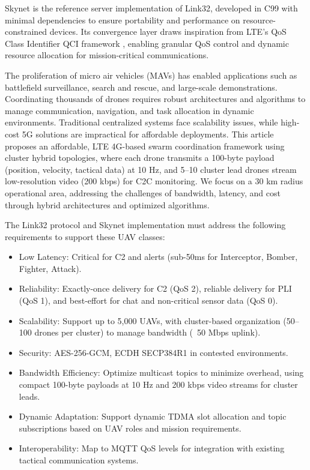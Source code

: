 \documentclass{article}
\begin{document}
Skynet is the reference server implementation of Link32, developed in C99 with minimal dependencies
to ensure portability and performance on resource-constrained devices. Its convergence layer draws
inspiration from LTE’s QoS Class Identifier QCI framework \cite{3gpp}, enabling granular QoS control and
dynamic resource allocation for mission-critical communications.

The proliferation of micro air vehicles (MAVs) has enabled applications
such as battlefield surveillance, search and rescue, and large-scale demonstrations.
Coordinating thousands of drones requires robust architectures and algorithms to
manage communication, navigation, and task allocation in dynamic environments.
Traditional centralized systems face scalability issues, while high-cost 5G
solutions are impractical for affordable deployments. This article proposes
an affordable, LTE 4G-based swarm coordination framework using cluster hybrid
topologies, where each drone transmits a 100-byte payload (position, velocity,
tactical data) at 10 Hz, and 5--10 cluster lead drones stream low-resolution
video (200 kbps) for C2C monitoring. We focus on a 30 km radius operational
area, addressing the challenges of bandwidth, latency, and cost through
hybrid architectures and optimized algorithms.

The Link32 protocol and Skynet implementation must address
the following requirements to support these UAV classes:

\begin{itemize}
\item Low Latency: Critical for C2 and alerts (sub-50ms for Interceptor, Bomber, Fighter, Attack).
\item Reliability: Exactly-once delivery for C2 (QoS 2), reliable delivery for PLI (QoS 1), and best-effort for chat and non-critical sensor data (QoS 0).
\item Scalability: Support up to 5,000 UAVs, with cluster-based organization (50–100 drones per cluster) to manage bandwidth (~50 Mbps uplink).
\item Security: AES-256-GCM, ECDH SECP384R1 in contested environments.
\item Bandwidth Efficiency: Optimize multicast topics to minimize overhead, using compact 100-byte payloads at 10 Hz and 200 kbps video streams for cluster leads.
\item Dynamic Adaptation: Support dynamic TDMA slot allocation and topic subscriptions based on UAV roles and mission requirements.
\item Interoperability: Map to MQTT QoS levels for integration with existing tactical communication systems.
\end{itemize}
\end{document}

